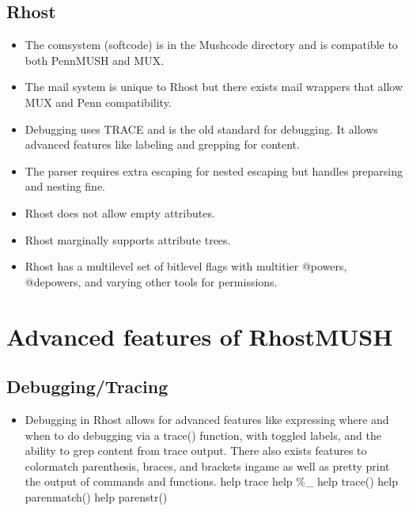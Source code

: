 \documentclass[letterpaper,10pt,english]{sphinxmanual}
\begin{document}
\section{Rhost}
\label{\detokenize{11-differences:rhost}}\begin{itemize}
\item {} 
\sphinxAtStartPar
The comsystem (softcode) is in the Mushcode directory and is compatible
to both PennMUSH and MUX.

\item {} 
\sphinxAtStartPar
The mail system is unique to Rhost but there exists mail wrappers that
allow MUX and Penn compatibility.

\item {} 
\sphinxAtStartPar
Debugging uses TRACE and is the old standard for debugging.  It allows
advanced features like labeling and grepping for content.

\item {} 
\sphinxAtStartPar
The parser requires extra escaping for nested escaping but handles pre\sphinxhyphen{}parsing
and nesting fine.

\item {} 
\sphinxAtStartPar
Rhost does not allow empty attributes.

\item {} 
\sphinxAtStartPar
Rhost marginally supports attribute trees.

\item {} 
\sphinxAtStartPar
Rhost has a multi\sphinxhyphen{}level set of bitlevel flags with multi\sphinxhyphen{}tier @powers,
@depowers, and varying other tools for permissions.

\end{itemize}


\chapter{Advanced features of RhostMUSH}
\label{\detokenize{12-advanced:advanced-features-of-rhostmush}}\label{\detokenize{12-advanced::doc}}

\section{Debugging/Tracing}
\label{\detokenize{12-advanced:debugging-tracing}}\begin{itemize}
\item {} 
\sphinxAtStartPar
Debugging in Rhost allows for advanced features like expressing where and
when to do debugging via a trace() function, with toggled labels, and the
ability to grep content from trace output.  There also exists features to
color\sphinxhyphen{}match parenthesis, braces, and brackets in\sphinxhyphen{}game as well as pretty print
the output of commands and functions.
\sphinxhyphen{} help trace
\sphinxhyphen{} help \%\_
\sphinxhyphen{} help trace()
\sphinxhyphen{} help parenmatch()
\sphinxhyphen{} help parenstr()

\end{itemize}
\end{document}
